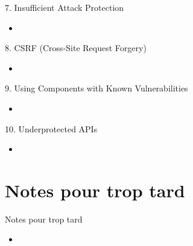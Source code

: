 \documentclass{beamer}
\begin{document}
	\begin{frame}{7. Insufficient Attack Protection}
		\begin{itemize}
			\item %
		\end{itemize}
	\end{frame}
	\begin{frame}{8. CSRF (Cross-Site Request Forgery)}
		\begin{itemize}
			\item %
		\end{itemize}
	\end{frame}
	\begin{frame}{9. Using Components with Known Vulnerabilities}
		\begin{itemize}
			\item %
		\end{itemize}
	\end{frame}
	\begin{frame}{10. Underprotected APIs}
		\begin{itemize}
			\item %
		\end{itemize}
	\end{frame}
	
\section{Notes pour trop tard}
	\begin{frame}{Notes pour trop tard}
		\begin{itemize}
			\item %
		\end{itemize}
	\end{frame}
\end{document}
